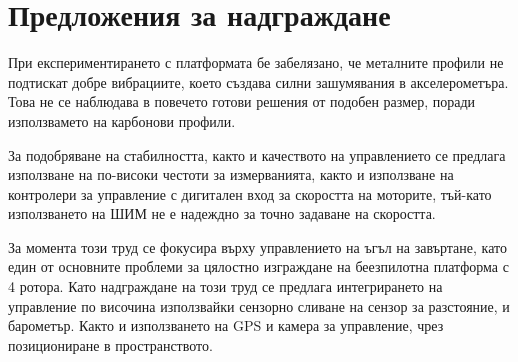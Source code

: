 \section{Предложения за надграждане}

При експериментирането с платформата бе забелязано,
че металните профили не подтискат добре вибрациите, което създава силни зашумявания в акселерометъра.
Това не се наблюдава в повечето готови решения от подобен размер, поради използвамето на карбонови профили.

За подобряване на стабилността, както и качеството на управлението се предлага използване на по-високи честоти за измерванията,
както и използване на контролери за управление с дигитален вход за  скоростта на моторите,
тъй-като използването на ШИМ не е надеждно за точно задаване на скоростта.

За момента този труд се фокусира върху управлението на ъгъл на завъртане, като един от основните проблеми за цялостно изграждане на беезпилотна платформа с 4 ротора.
Като надграждане на този труд се предлага интегрирането на управление по височина използвайки сензорно сливане на сензор за разстояние, и барометър.
Както и използването на GPS и камера за управление, чрез позициониране в пространството.